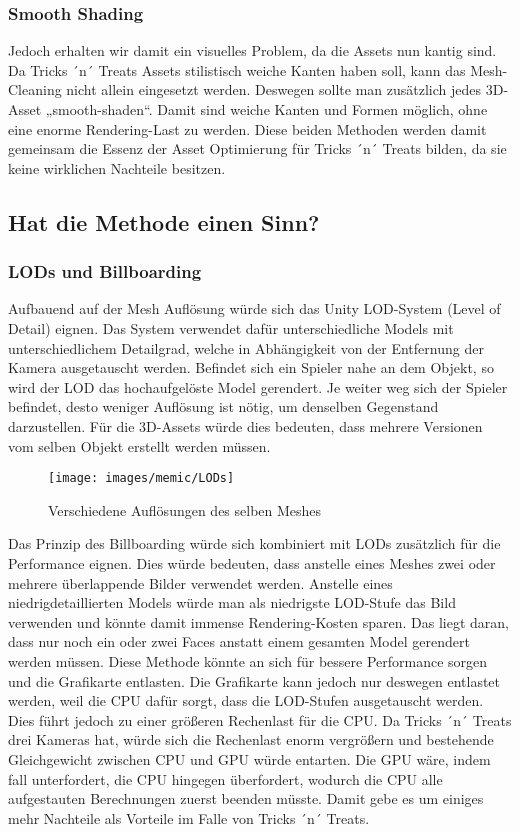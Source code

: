 \subsubsection{Smooth Shading}

Jedoch erhalten wir damit ein visuelles Problem, da die Assets nun kantig sind. Da Tricks ´n´ Treats Assets stilistisch weiche Kanten haben soll, kann das Mesh-Cleaning nicht allein eingesetzt werden. Deswegen sollte man zusätzlich jedes 3D-Asset „smooth-shaden“. Damit sind weiche Kanten und Formen möglich, ohne eine enorme Rendering-Last zu werden. Diese beiden Methoden werden damit gemeinsam die Essenz der Asset Optimierung für Tricks ´n´ Treats bilden, da sie keine wirklichen Nachteile besitzen.

\subsection{Hat die Methode einen Sinn?}

\subsubsection{LODs und Billboarding}

Aufbauend auf der Mesh Auflösung würde sich das Unity LOD-System (Level of Detail) eignen. Das System verwendet dafür unterschiedliche Models mit unterschiedlichem Detailgrad, welche in Abhängigkeit von der Entfernung der Kamera ausgetauscht werden. Befindet sich ein Spieler nahe an dem Objekt, so wird der LOD das hochaufgelöste Model gerendert. Je weiter weg sich der Spieler befindet, desto weniger Auflösung ist nötig, um denselben Gegenstand darzustellen. Für die 3D-Assets würde dies bedeuten, dass mehrere Versionen vom selben Objekt erstellt werden müssen.

\begin{figure}[H]
	\centering
	\texttt{[image: images/memic/LODs]}
	\caption{Verschiedene Auflösungen des selben Meshes}
\end{figure}

Das Prinzip des Billboarding würde sich kombiniert mit LODs zusätzlich für die Performance eignen. Dies würde bedeuten, dass anstelle eines Meshes zwei oder mehrere überlappende Bilder verwendet werden. Anstelle eines niedrigdetaillierten Models würde man als niedrigste LOD-Stufe das Bild verwenden und könnte damit immense Rendering-Kosten sparen. Das liegt daran, dass nur noch ein oder zwei Faces anstatt einem gesamten Model gerendert werden müssen.
Diese Methode könnte an sich für bessere Performance sorgen und die Grafikarte entlasten. Die Grafikarte kann jedoch nur deswegen entlastet werden, weil die CPU dafür sorgt, dass die LOD-Stufen ausgetauscht werden. Dies führt jedoch zu einer größeren Rechenlast für die CPU. Da Tricks ´n´ Treats drei Kameras hat, würde sich die Rechenlast enorm vergrößern und bestehende Gleichgewicht zwischen CPU und GPU würde entarten. Die GPU wäre, indem fall unterfordert, die CPU hingegen überfordert, wodurch die CPU alle aufgestauten Berechnungen zuerst beenden müsste. Damit gebe es um einiges mehr Nachteile als Vorteile im Falle von Tricks ´n´ Treats.

